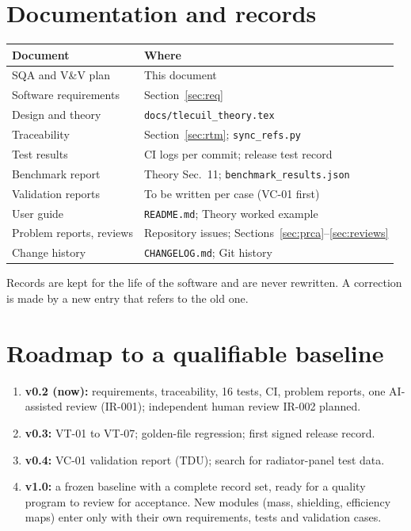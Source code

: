 \documentclass[11pt]{article}
\begin{document}
\section{Documentation and records}\label{sec:records}
\begin{center}
\begin{tabularx}{\textwidth}{lL}
\toprule
Document & Where \\
\midrule
SQA and V\&V plan & This document \\
Software requirements & Section~\ref{sec:req} \\
Design and theory & \texttt{docs/tlecuil\_theory.tex} \\
Traceability & Section~\ref{sec:rtm}; \texttt{sync\_refs.py} \\
Test results & CI logs per commit; release test record \\
Benchmark report & Theory Sec.~11; \texttt{benchmark\_results.json} \\
Validation reports & To be written per case (VC-01 first) \\
User guide & \texttt{README.md}; Theory worked example \\
Problem reports, reviews & Repository issues; Sections~\ref{sec:prca}--\ref{sec:reviews} \\
Change history & \texttt{CHANGELOG.md}; Git history \\
\bottomrule
\end{tabularx}
\end{center}
Records are kept for the life of the software and are never rewritten. A correction is
made by a new entry that refers to the old one.

\section{Roadmap to a qualifiable baseline}
\begin{enumerate}
  \item \textbf{v0.2 (now):} requirements, traceability, 16 tests, CI, problem reports,
        one AI-assisted review (IR-001); independent human review IR-002 planned.
  \item \textbf{v0.3:} VT-01 to VT-07; golden-file regression; first signed release record.
  \item \textbf{v0.4:} VC-01 validation report (TDU); search for radiator-panel test data.
  \item \textbf{v1.0:} a frozen baseline with a complete record set, ready for a quality
        program to review for acceptance. New modules (mass, shielding, efficiency maps)
        enter only with their own requirements, tests and validation cases.
\end{enumerate}

\setcounter{biburlnumpenalty}{9000}\setcounter{biburllcpenalty}{7000}\setcounter{biburlucpenalty}{8000}
\printbibliography[heading=bibintoc]
\end{document}
